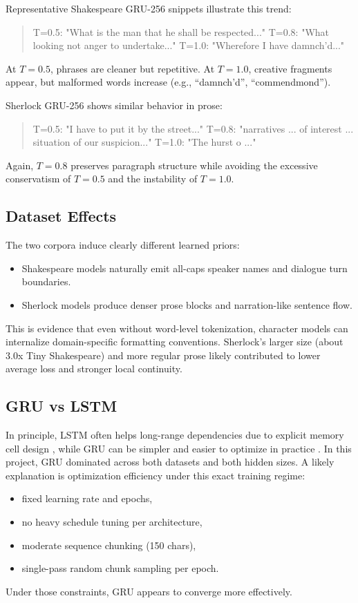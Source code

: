 \documentclass[10pt,twocolumn,letterpaper]{article}
\begin{document}
Representative Shakespeare GRU-256 snippets illustrate this trend:
\begin{quote}\footnotesize\ttfamily
T=0.5: "What is the man that he shall be respected..."\newline
T=0.8: "What looking not anger to undertake..."\newline
T=1.0: "Wherefore I have damnch'd..."
\end{quote}
At $T=0.5$, phrases are cleaner but repetitive. At $T=1.0$, creative fragments appear, but malformed words increase (e.g., ``damnch'd'', ``commendmond'').

Sherlock GRU-256 shows similar behavior in prose:
\begin{quote}\footnotesize\ttfamily
T=0.5: "I have to put it by the street..."\newline
T=0.8: "narratives ... of interest ... situation of our suspicion..."\newline
T=1.0: "The hurst o ..."
\end{quote}
Again, $T=0.8$ preserves paragraph structure while avoiding the excessive conservatism of $T=0.5$ and the instability of $T=1.0$.

\subsection{Dataset Effects}
The two corpora induce clearly different learned priors:
\begin{itemize}
\item Shakespeare models naturally emit all-caps speaker names and dialogue turn boundaries.
\item Sherlock models produce denser prose blocks and narration-like sentence flow.
\end{itemize}

This is evidence that even without word-level tokenization, character models can internalize domain-specific formatting conventions. Sherlock's larger size (about 3.0x Tiny Shakespeare) and more regular prose likely contributed to lower average loss and stronger local continuity.

\subsection{GRU vs LSTM}
In principle, LSTM often helps long-range dependencies due to explicit memory cell design \cite{hochreiter1997}, while GRU can be simpler and easier to optimize in practice \cite{cho2014}. In this project, GRU dominated across both datasets and both hidden sizes. A likely explanation is optimization efficiency under this exact training regime:
\begin{itemize}
\item fixed learning rate and epochs,
\item no heavy schedule tuning per architecture,
\item moderate sequence chunking (150 chars),
\item single-pass random chunk sampling per epoch.
\end{itemize}
Under those constraints, GRU appears to converge more effectively.
\end{document}
